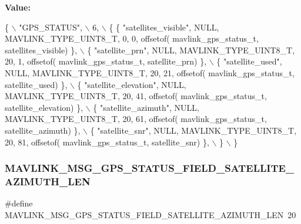 {\bfseries Value\+:}
\begin{DoxyCode}
\{ \(\backslash\)
    \textcolor{stringliteral}{"GPS\_STATUS"}, \(\backslash\)
    6, \(\backslash\)
    \{  \{ \textcolor{stringliteral}{"satellites\_visible"}, NULL, MAVLINK_TYPE_UINT8_T, 0, 0, offsetof(
      mavlink_gps_status_t, satellites\_visible) \}, \(\backslash\)
         \{ \textcolor{stringliteral}{"satellite\_prn"}, NULL, MAVLINK_TYPE_UINT8_T, 20, 1, offsetof(
      mavlink_gps_status_t, satellite\_prn) \}, \(\backslash\)
         \{ \textcolor{stringliteral}{"satellite\_used"}, NULL, MAVLINK_TYPE_UINT8_T, 20, 21, offsetof(
      mavlink_gps_status_t, satellite\_used) \}, \(\backslash\)
         \{ \textcolor{stringliteral}{"satellite\_elevation"}, NULL, MAVLINK_TYPE_UINT8_T, 20, 41, offsetof(
      mavlink_gps_status_t, satellite\_elevation) \}, \(\backslash\)
         \{ \textcolor{stringliteral}{"satellite\_azimuth"}, NULL, MAVLINK_TYPE_UINT8_T, 20, 61, offsetof(
      mavlink_gps_status_t, satellite\_azimuth) \}, \(\backslash\)
         \{ \textcolor{stringliteral}{"satellite\_snr"}, NULL, MAVLINK_TYPE_UINT8_T, 20, 81, offsetof(
      mavlink_gps_status_t, satellite\_snr) \}, \(\backslash\)
         \} \(\backslash\)
\}
\end{DoxyCode}
\mbox{\label{mavlink__msg__gps__status_8h_ae45ab7e54f071569ae2636a8ef12e196}} 
\subsubsection{M\+A\+V\+L\+I\+N\+K\+\_\+\+M\+S\+G\+\_\+\+G\+P\+S\+\_\+\+S\+T\+A\+T\+U\+S\+\_\+\+F\+I\+E\+L\+D\+\_\+\+S\+A\+T\+E\+L\+L\+I\+T\+E\+\_\+\+A\+Z\+I\+M\+U\+T\+H\+\_\+\+L\+EN}
{\footnotesize\ttfamily \#define M\+A\+V\+L\+I\+N\+K\+\_\+\+M\+S\+G\+\_\+\+G\+P\+S\+\_\+\+S\+T\+A\+T\+U\+S\+\_\+\+F\+I\+E\+L\+D\+\_\+\+S\+A\+T\+E\+L\+L\+I\+T\+E\+\_\+\+A\+Z\+I\+M\+U\+T\+H\+\_\+\+L\+EN~20}

